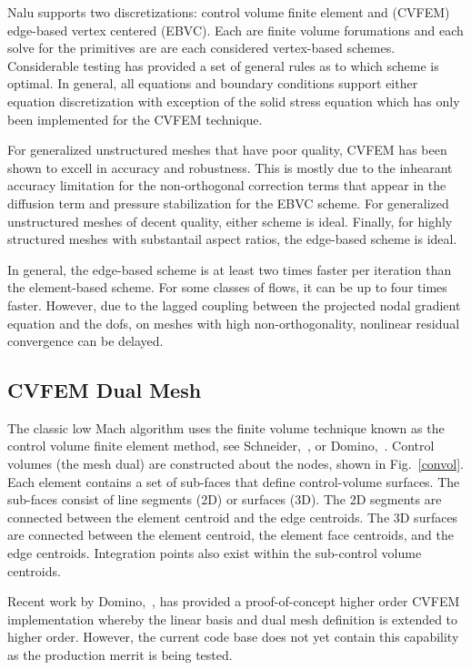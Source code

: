 Nalu supports two discretizations: control volume finite element
and (CVFEM) edge-based vertex centered (EBVC). Each are finite volume forumations
and each solve for the primitives are are each considered vertex-based
schemes. Considerable testing has provided a set of general rules as to which
scheme is optimal. In general, all equations and boundary conditions
support either equation discretization with exception of the solid stress equation
which has only been implemented for the CVFEM technique.

For generalized unstructured meshes that have poor quality,
CVFEM has been shown to excell in accuracy and robustness. This is mostly
due to the inhearant accuracy limitation for the non-orthogonal
correction terms that appear in the diffusion term and pressure
stabilization for the EBVC scheme. For generalized unstructured meshes of decent quality, either 
scheme is ideal. Finally, for highly structured meshes with substantail aspect 
ratios, the edge-based scheme is ideal.

In general, the edge-based scheme is at least two times faster per iteration 
than the element-based scheme. For some classes of flows, it can be up
to four times faster. However, due to the lagged coupling between the projected
nodal gradient equation and the dofs, on meshes with high non-orthogonality,
nonlinear residual convergence can be delayed.

\subsection{CVFEM Dual Mesh}

The classic low Mach algorithm uses the finite volume technique known
as the control volume finite element method, see Schneider,~\cite{Schneider:1987}, or 
Domino,~\cite{Domino:2006}. Control volumes 
(the mesh dual) are constructed about the nodes, shown in Fig.~\ref{convol}.
Each element contains a set of sub-faces that define control-volume surfaces.
The sub-faces consist of line segments (2D) or surfaces (3D).
The 2D segments are connected between the element centroid
and the edge centroids. The 3D surfaces are connected between
the element centroid, the element face centroids, and the
edge centroids. Integration points also exist within the sub-control
volume centroids. 

Recent work by Domino,~\cite{Domino:2014}, has provided a proof-of-concept higher order CVFEM implementation 
whereby the linear basis and dual mesh definition is extended to higher order. However, the current code base
does not yet contain this capability as the production merrit is being tested.

